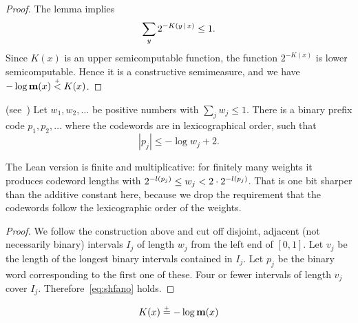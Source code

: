  \begin{proof}
  \leanok
The lemma implies 
 \begin{equation} \sum_y 2^{-K(y \,\vert\, x)} \le 1.  \label{eq:condHsum} 
 \end{equation}
  Since \( K(x) \) is an upper semicomputable function, the function
\( 2^{-K(x)} \) is lower semicomputable. 
Hence it is a constructive semimeasure, and we have \( -\log \mathbf{m}(x) \stackrel{{}_+}{<} K(x) \).
 \end{proof}

\begin{lemma}
  \label{l:shannon-fano}
  \leanok
   (see~\cite{CsiszarKornerBook81})
 Let \( w_{1},w_{2},\ldots \) be positive numbers with \( \sum_{j} w_{j} \le 1 \).
There is a binary prefix code \( p_{1},p_{2},\ldots \) where the codewords
are in lexicographical order, such that 
 \begin{equation} 	|p_{j}| \le -\log w_{j} + 2. \label{eq:shfano} 
 \end{equation}
 \end{lemma}

\begin{formalization}
The Lean version is finite and multiplicative: for finitely many weights it produces codeword lengths with $2^{-l(p_j)} \le w_j < 2 \cdot 2^{-l(p_j)}$. That is one bit sharper than the additive constant here, because we drop the requirement that the codewords follow the lexicographic order of the weights.
\end{formalization}

 \begin{proof}
  \leanok
   We follow the construction above and cut off disjoint,
adjacent (not necessarily binary) intervals \( I_{j} \) of length \( w_{j} \) from 
the left end of \( [0,1] \). Let \( v_{j} \) be the length of the longest binary 
intervals contained in \( I_{j} \). 
Let \( p_{j} \) be the binary word corresponding to the first one of these. 
Four or fewer intervals of length \( v_{j} \) cover \( I_{j} \). 
Therefore~\eqref{eq:shfano} holds. 
\end{proof}

\begin{theorem}
  \leanok
\label{thm:coding} 
  \begin{equation}  	K(x) \stackrel{{}_+}{=} -\log\mathbf{m}(x) \label{eq:codingth} 
  \end{equation}
 \end{theorem}

